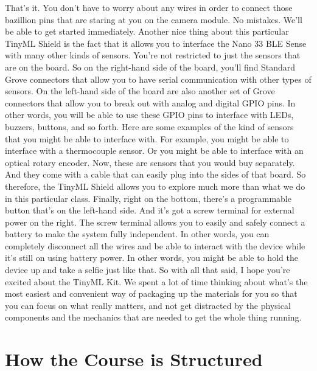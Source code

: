 That's it.
You don't have to worry about any wires in order to connect those bazillion pins that are staring at you on the camera module.
No mistakes.
We'll be able to get started immediately.
Another nice thing about this particular TinyML Shield is the fact that it allows you to interface the Nano 33 BLE Sense with many other kinds of sensors.
You're not restricted to just the sensors that are on the board.
So on the right-hand side of the board, you'll find Standard Grove connectors that allow you to have serial communication with other types of sensors.
On the left-hand side of the board are also another set of Grove connectors that allow you to break out with analog and digital GPIO pins.
In other words, you will be able to use these GPIO pins to interface with LEDs, buzzers, buttons, and so forth.
Here are some examples of the kind of sensors that you might be able to interface with.
For example, you might be able to interface with a thermocouple sensor.
Or you might be able to interface with an optical rotary encoder.
Now, these are sensors that you would buy separately.
And they come with a cable that can easily plug into the sides of that board.
So therefore, the TinyML Shield allows you to explore much more than what we do in this particular class.
Finally, right on the bottom, there's a programmable button that's on the left-hand side.
And it's got a screw terminal for external power on the right.
The screw terminal allows you to easily and safely connect a battery to make the system fully independent.
In other words, you can completely disconnect all the wires and be able to interact with the device while it's still on using battery power.
In other words, you might be able to hold the device up and take a selfie just like that.
So with all that said, I hope you're excited about the TinyML Kit.
We spent a lot of time thinking about what's the most easiest and convenient way of packaging up the materials for you so that you can focus on what really matters, and not get distracted by the physical components and the mechanics that are needed to get the whole thing running.

\section{How the Course is Structured}

